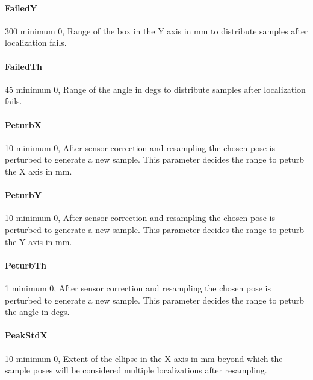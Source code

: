 \documentclass{article}
\begin{document}
\paragraph{FailedY} 300               minimum 0,  Range of the box in the Y axis in mm to
                          distribute samples after localization fails.

\paragraph{FailedTh} 45               minimum 0,  Range of the angle in degs to distribute
                          samples after localization fails.

\paragraph{PeturbX} 10                minimum 0,  After sensor correction and resampling
                          the chosen pose is perturbed to generate a new
                          sample. This parameter decides the range to peturb
                          the X axis in mm.

\paragraph{PeturbY} 10                minimum 0,  After sensor correction and resampling
                          the chosen pose is perturbed to generate a new
                          sample. This parameter decides the range to peturb
                          the Y axis in mm.

\paragraph{PeturbTh} 1                minimum 0,  After sensor correction and resampling
                          the chosen pose is perturbed to generate a new
                          sample. This parameter decides the range to peturb
                          the angle in degs.

\paragraph{PeakStdX} 10               minimum 0,  Extent of the ellipse in the X axis in
                          mm beyond which the sample poses will be considered
                          multiple localizations after resampling.
\end{document}
